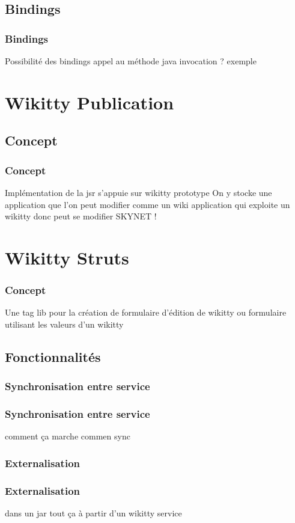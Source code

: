 \documentclass[12pt,a4paper,utf8x]{beamer}
\begin{document}
\subsection{Bindings}
\begin{frame}\frametitle{Bindings}
Possibilité des bindings
appel au méthode java
invocation
?
exemple
\end{frame}


\section{Wikitty Publication} 
\subsection{Concept}
\begin{frame}\frametitle{Concept}

Implémentation de la jsr
s'appuie sur wikitty
prototype
On y stocke une application 
que l'on peut modifier comme un wiki
application qui exploite un wikitty
donc peut se modifier
SKYNET !
\end{frame}




\section{Wikitty Struts} 

\begin{frame}\frametitle{Concept}
Une tag lib pour
la création de formulaire d'édition de wikitty
ou formulaire utilisant les valeurs d'un wikitty

\end{frame}

\subsection{Fonctionnalités}
\subsubsection{Synchronisation entre service}
\begin{frame}\frametitle{Synchronisation entre service}
comment ça marche 
commen sync
\end{frame}

\subsubsection{Externalisation}
\begin{frame}\frametitle{Externalisation}
dans un jar tout ça
à partir d'un wikitty service
\end{frame}
\end{document}
